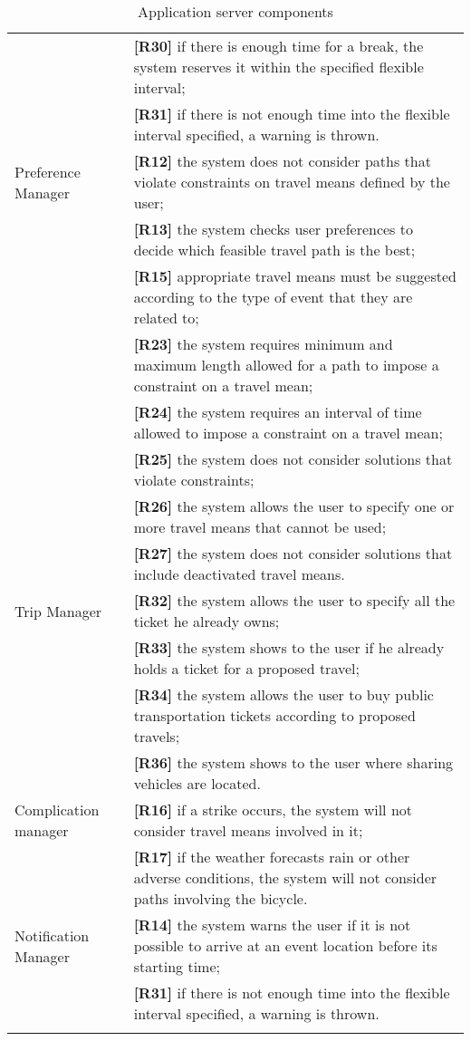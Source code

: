 \begin{center}
\begin{longtable}{ | p{} | p{} | }
		& \textbf{[R30]} if there is enough time for a break, the system reserves it within the specified flexible interval;\\
		& \textbf{[R31]} if there is not enough time into the flexible interval specified, a warning is thrown.\\
		\hline
		Preference Manager & \textbf{[R12]} the system does not consider paths that violate constraints on travel means defined by the user;\\
		& \textbf{[R13]} the system checks user preferences to decide which feasible travel path is the best;\\
		& \textbf{[R15]} appropriate travel means must be suggested according to the type of event that they are related to; \\
		& \textbf{[R23]} the system requires minimum and maximum length allowed for a path to impose a constraint on a travel mean;\\
		& \textbf{[R24]} the system requires an interval of time allowed to impose a constraint on a travel mean;\\
		& \textbf{[R25]} the system does not consider solutions that violate constraints;\\
		& \textbf{[R26]} the system allows the user to specify one or more travel means that cannot be used;\\
		& \textbf{[R27]} the system does not consider solutions that include deactivated travel means.\\
		\hline		
		Trip Manager & \textbf{[R32]} the system allows the user to specify all the ticket he already owns;\\
		& \textbf{[R33]} the system shows to the user if he already holds a ticket for a proposed travel;\\
		& \textbf{[R34]} the system allows the user to buy public transportation tickets according to proposed travels;\\
		& \textbf{[R36]} the system shows to the user where sharing vehicles are located.\\
		\hline
		Complication manager & \textbf{[R16]} if a strike occurs, the system will not consider travel means involved in it;\\
		& \textbf{[R17]} if the weather forecasts rain or other adverse conditions, the system will not consider paths involving the bicycle.\\
		\hline
		Notification Manager & \textbf{[R14]} the system warns the user if it is not possible to arrive at an event location before its starting time;\\
		& \textbf{[R31]} if there is not enough time into the flexible interval specified, a warning is thrown.\\
		\hline
		
		\caption{Application server components}
	\end{longtable}
\end{center}

